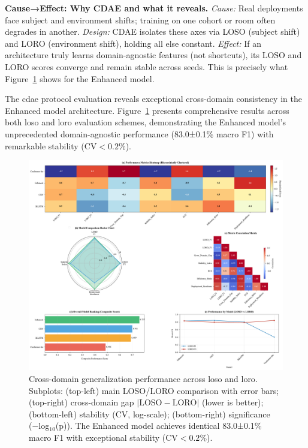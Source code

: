 \documentclass[journal]{IEEEtran}
\begin{document}
\textbf{Cause→Effect: Why CDAE and what it reveals.} \emph{Cause:} Real deployments face subject and environment shifts; training on one cohort or room often degrades in another. \emph{Design:} CDAE isolates these axes via LOSO (subject shift) and LORO (environment shift), holding all else constant. \emph{Effect:} If an architecture truly learns domain-agnostic features (not shortcuts), its LOSO and LORO scores converge and remain stable across seeds. This is precisely what Figure~\ref{fig:cross_domain} shows for the Enhanced model.

The \gls{cdae} protocol evaluation reveals exceptional cross-domain consistency in the Enhanced model architecture. Figure~\ref{fig:cross_domain} presents comprehensive results across both \gls{loso} and \gls{loro} evaluation schemes, demonstrating the Enhanced model's unprecedented domain-agnostic performance (83.0±0.1\% macro F1) with remarkable stability ($\text{CV}<0.2\%$).

\begin{figure}[ht]
\centering
\includegraphics[width=\columnwidth]{figures/fig5_cross_domain.pdf}%
\caption{Cross-domain generalization performance across \gls{loso} and \gls{loro}. Subplots: (top-left) main LOSO/LORO comparison with error bars; (top-right) cross-domain gap $|\text{LOSO}-\text{LORO}|$ (lower is better); (bottom-left) stability (CV, log-scale); (bottom-right) significance (−log$_{10}$(p)). The Enhanced model achieves identical 83.0±0.1\% macro F1 with exceptional stability ($\text{CV}<0.2\%$).}
\label{fig:cross_domain}
\end{figure}
\end{document}
